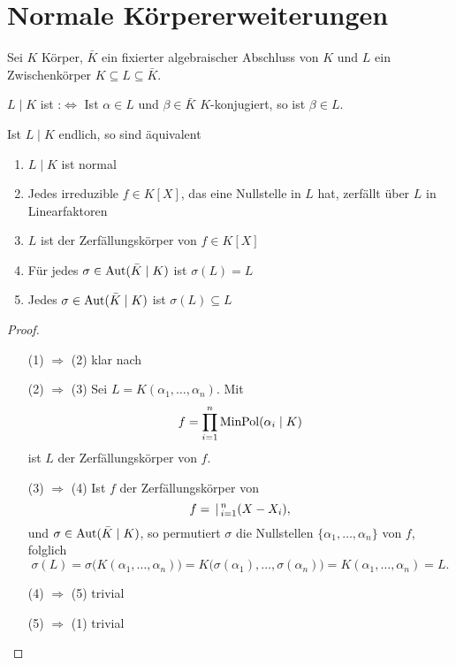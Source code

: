 \section{Normale Körpererweiterungen}
Sei $K$ Körper, $\bar K$ ein fixierter algebraischer Abschluss von $K$ und $L$ ein Zwischenkörper $K\subseteq L\subseteq \bar K$.

\begin{definition}
	$L\mid K$ ist  :$\Leftrightarrow$ Ist $\alpha\in L$ und $\beta\in\bar K$ $K$-konjugiert, so ist $\beta\in L$.
\end{definition}

\begin{proposition}
	Ist $L\mid K$ endlich, so sind äquivalent \begin{enumerate}[label={(\arabic*)}]
		\item $L\mid K$ ist normal
		\item Jedes irreduzible $f\in K[X]$, das eine Nullstelle in $L$ hat, zerfällt über $L$ in Linearfaktoren
		\item $L$ ist der Zerfällungskörper von $f\in K[X]$
		\item Für jedes $\sigma\in\operatorname{Aut}(\bar K\mid K)$ ist $\sigma(L) = L$
		\item Jedes $\sigma\in\operatorname{Aut}(\bar K\mid K)$ ist $\sigma(L)\subseteq L$
	\end{enumerate}
\end{proposition}

\begin{proof}\leavevmode
	\begin{itemize}[widest={(1) $\Rightarrow$ (2)},leftmargin=*,topsep=-6pt]
		\item[(1) $\Rightarrow$ (2)] klar nach 
		\item[(2) $\Rightarrow$ (3)] Sei $L = K(\alpha_1,\dots,\alpha_n)$. Mit \begin{equation*}
			f = \prod_{i=1}^n \operatorname{MinPol}(\alpha_i\mid K)
		\end{equation*}
		ist $L$ der Zerfällungskörper von $f$.
		\item[(3) $\Rightarrow$ (4)] Ist $f$ der Zerfällungskörper von\begin{equation*}
			f = \,|\,_{i=1}^n (X - X_i),
		\end{equation*}
		und $\sigma\in\operatorname{Aut}(\bar K\mid K)$, so permutiert $\sigma$ die Nullstellen $\lbrace \alpha_1,\dots,\alpha_n\rbrace$ von $f$, folglich \begin{equation*}
			\sigma(L) = \sigma\big( K(\alpha_1,\dots,\alpha_n)\big) = K\big(\sigma(\alpha_1),\dots,\sigma(\alpha_n)\big) = K(\alpha_1,\dots,\alpha_n) = L.
		\end{equation*}
		\item[(4) $\Rightarrow$ (5)] trivial
		\item[(5) $\Rightarrow$ (1)] trivial
	\end{itemize}
\end{proof}


